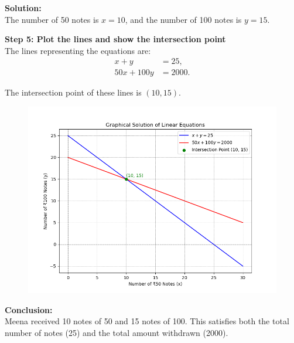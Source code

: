 \documentclass[journal]{IEEEtran}
\begin{document}
	\textbf{Solution:}\\
	The number of 50 notes is \(x = 10\), and the number of 100 notes is \(y = 15\).
	
	\textbf{Step 5: Plot the lines and show the intersection point}\\
	The lines representing the equations are:
	\begin{align}
		x + y &= 25, \\
		50x + 100y &= 2000.
	\end{align}
	
	The intersection point of these lines is \((10, 15)\).
	
	\begin{figure}[h]
		\centering
		\includegraphics[width=\textwidth]{figs/fig.png}
	\end{figure}
	
	\textbf{Conclusion:}\\
	Meena received 10 notes of 50 and 15 notes of 100. This satisfies both the total number of notes (25) and the total amount withdrawn (2000).
	
	
\end{document}

